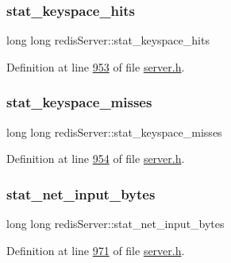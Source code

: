 \mbox{\label{structredisServer_ab69317f9a81309ac9e6d8092abc55225}} 
\subsubsection{\texorpdfstring{stat\+\_\+keyspace\+\_\+hits}{stat\_keyspace\_hits}}
{\footnotesize\ttfamily long long redis\+Server\+::stat\+\_\+keyspace\+\_\+hits}



Definition at line \hyperlink{server_8h_source_l00953}{953} of file \hyperlink{server_8h_source}{server.\+h}.

\mbox{\label{structredisServer_a95869f3d500b5b18555a20d3bb1cfaf2}} 
\subsubsection{\texorpdfstring{stat\+\_\+keyspace\+\_\+misses}{stat\_keyspace\_misses}}
{\footnotesize\ttfamily long long redis\+Server\+::stat\+\_\+keyspace\+\_\+misses}



Definition at line \hyperlink{server_8h_source_l00954}{954} of file \hyperlink{server_8h_source}{server.\+h}.

\mbox{\label{structredisServer_a28586828e397cc73009b6673e6dc4e3b}} 
\subsubsection{\texorpdfstring{stat\+\_\+net\+\_\+input\+\_\+bytes}{stat\_net\_input\_bytes}}
{\footnotesize\ttfamily long long redis\+Server\+::stat\+\_\+net\+\_\+input\+\_\+bytes}



Definition at line \hyperlink{server_8h_source_l00971}{971} of file \hyperlink{server_8h_source}{server.\+h}.

